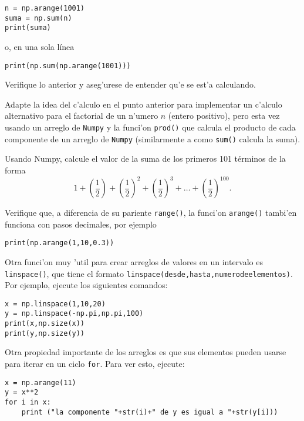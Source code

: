 \documentclass[11pt]{exam}
\begin{document}
\begin{questions}
\begin{verbatim}
n = np.arange(1001)
suma = np.sum(n)
print(suma)
\end{verbatim}
o, en una sola línea

\begin{verbatim}
print(np.sum(np.arange(1001)))
\end{verbatim}
Verifique lo anterior y aseg'urese de entender qu'e se est'a calculando.

\item Adapte la idea del c'alculo en el punto anterior para implementar un c'alculo alternativo para el factorial de un n'umero $n$ (entero positivo), pero esta vez usando un arreglo de \texttt{Numpy} y la funci'on \texttt{prod()} que calcula el producto de cada componente de un arreglo de \texttt{Numpy} (similarmente a como \texttt{sum()} calcula la suma).

\item Usando Numpy, calcule el valor de la suma de los primeros 101 términos de la forma
\begin{equation}
1+\left(\frac{1}{2}\right)+\left(\frac{1}{2}\right)^2+\left(\frac{1}{2}\right)^3+\dots +\left(\frac{1}{2}\right)^{100}.
\end{equation}
\item Verifique que, a diferencia de su pariente \texttt{range()}, la funci'on \texttt{arange()} tambi'en funciona con pasos decimales, por ejemplo

\begin{verbatim}
print(np.arange(1,10,0.3))
\end{verbatim}

\item Otra funci'on muy 'util para crear arreglos de valores en un intervalo es \texttt{linspace()}, que tiene el formato \texttt{linspace(desde,hasta,numerodeelementos)}. Por ejemplo, ejecute los siguientes comandos:

\begin{verbatim}
x = np.linspace(1,10,20)
y = np.linspace(-np.pi,np.pi,100)
print(x,np.size(x))
print(y,np.size(y))
\end{verbatim}

\item Otra propiedad importante de los arreglos es que sus elementos pueden usarse para iterar en un ciclo \texttt{for}. Para ver esto, ejecute:

\begin{verbatim}
x = np.arange(11)
y = x**2
for i in x:
	print ("la componente "+str(i)+" de y es igual a "+str(y[i]))
\end{verbatim}


\end{questions}
\end{document}
